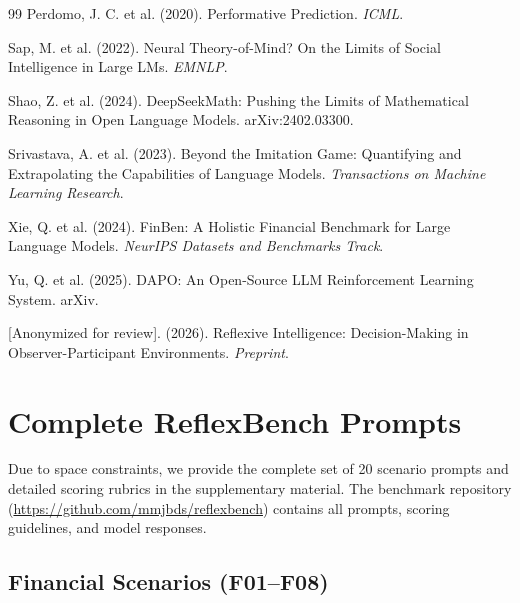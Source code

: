 \documentclass{article}
\begin{document}
\begin{thebibliography}{99}
Perdomo, J. C. et al. (2020).
Performative Prediction.
\textit{ICML}.

Sap, M. et al. (2022).
Neural Theory-of-Mind? On the Limits of Social Intelligence in Large LMs.
\textit{EMNLP}.

Shao, Z. et al. (2024).
DeepSeekMath: Pushing the Limits of Mathematical Reasoning in Open Language Models.
arXiv:2402.03300.

Srivastava, A. et al. (2023).
Beyond the Imitation Game: Quantifying and Extrapolating the Capabilities of Language Models.
\textit{Transactions on Machine Learning Research}.

Xie, Q. et al. (2024).
FinBen: A Holistic Financial Benchmark for Large Language Models.
\textit{NeurIPS Datasets and Benchmarks Track}.

Yu, Q. et al. (2025).
DAPO: An Open-Source LLM Reinforcement Learning System.
arXiv.

[Anonymized for review]. (2026).
Reflexive Intelligence: Decision-Making in Observer-Participant Environments.
\textit{Preprint}.

\end{thebibliography}

\appendix
\section{Complete ReflexBench Prompts}
\label{app:prompts}

Due to space constraints, we provide the complete set of 20 scenario prompts and detailed scoring rubrics in the supplementary material. The benchmark repository (\url{https://github.com/mmjbds/reflexbench}) contains all prompts, scoring guidelines, and model responses.

\subsection{Financial Scenarios (F01--F08)}
\end{document}
